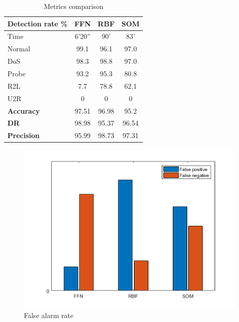 \documentclass[twocolumn,11pt]{asme2ej}
\begin{document}
\begin{table}[t]
\caption{Metrics comparison}
\begin{center}
\label{table_ASME}
\begin{tabular}{l c c c} %
\\\hline
\textbf{Detection rate \%} \hspace{0cm}& \textbf{FFN} \hspace{0cm}& \textbf{RBF} \hspace{0cm}& \textbf{SOM}\\
\hline
Time & 6'20'' & 90' & 83'\\
Normal & 99.1 & 96.1 & 97.0\\
DoS & 98.3 & 98.8 & 97.0\\
Probe & 93.2 & 95.3 & 80.8\\
R2L & 7.7 & 78.8 & 62.1\\
U2R & 0 & 0 & 0\\
\hline
\textbf{Accuracy} & 97.51 & 96.98 & 95.2\\
\textbf{DR} & 98.98 & 95.37 & 96.54\\
\textbf{Precision} & 95.99 & 98.73 & 97.31\\
\hline
\end{tabular}
\end{center}
\end{table}

\begin{figure}[h]
\centering
\includegraphics[scale=0.52]{Comparison_graph.png}
\caption{False alarm rate}
\end{figure}
\end{document}
